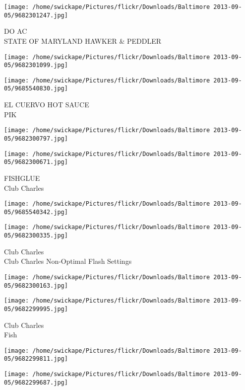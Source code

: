 \documentclass[10pt,letterpaper]{article}
\begin{document}
\vspace{0.25in}
\texttt{[image: /home/swickape/Pictures/flickr/Downloads/Baltimore 2013-09-05/9682301247.jpg]}

DO AC\\
STATE OF MARYLAND HAWKER \& PEDDLER
\pagebreak

\texttt{[image: /home/swickape/Pictures/flickr/Downloads/Baltimore 2013-09-05/9682301099.jpg]}

\vspace{0.25in}
\texttt{[image: /home/swickape/Pictures/flickr/Downloads/Baltimore 2013-09-05/9685540830.jpg]}

EL CUERVO HOT SAUCE\\
PIK
\pagebreak

\texttt{[image: /home/swickape/Pictures/flickr/Downloads/Baltimore 2013-09-05/9682300797.jpg]}

\vspace{0.25in}
\texttt{[image: /home/swickape/Pictures/flickr/Downloads/Baltimore 2013-09-05/9682300671.jpg]}

FISHGLUE\\
Club Charles
\pagebreak

\texttt{[image: /home/swickape/Pictures/flickr/Downloads/Baltimore 2013-09-05/9685540342.jpg]}

\vspace{0.25in}
\texttt{[image: /home/swickape/Pictures/flickr/Downloads/Baltimore 2013-09-05/9682300335.jpg]}

Club Charles\\
Club Charles Non{-}Optimal Flash Settings
\pagebreak

\texttt{[image: /home/swickape/Pictures/flickr/Downloads/Baltimore 2013-09-05/9682300163.jpg]}

\vspace{0.25in}
\texttt{[image: /home/swickape/Pictures/flickr/Downloads/Baltimore 2013-09-05/9682299995.jpg]}

Club Charles\\
Fish
\pagebreak

\texttt{[image: /home/swickape/Pictures/flickr/Downloads/Baltimore 2013-09-05/9682299811.jpg]}

\vspace{0.25in}
\texttt{[image: /home/swickape/Pictures/flickr/Downloads/Baltimore 2013-09-05/9682299687.jpg]}
\end{document}
